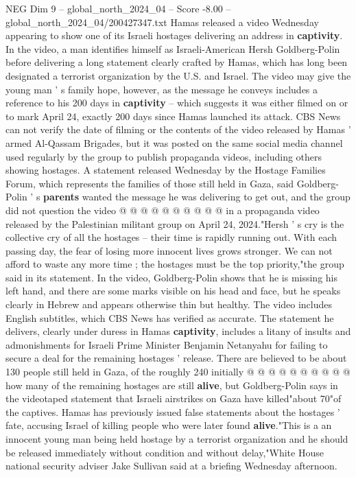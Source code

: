 \begin{textsample}{NEG Dim 9 – global\_north\_2024\_04 – Score -8.00 – global\_north\_2024\_04/200427347.txt}  \label{ex:f9_neg_264}
Hamas released a video Wednesday appearing to show one of its Israeli hostages delivering an address in \textbf{captivity}.
In the video, a man identifies himself as Israeli-American Hersh Goldberg-Polin before delivering a long statement clearly crafted by Hamas, which has long been designated a terrorist organization by the U.S. and Israel.
The video may give the young man ' s family hope, however, as the message he conveys includes a reference to his 200 days in \textbf{captivity} -- which suggests it was either filmed on or to mark April 24, exactly 200 days since Hamas launched its attack.
CBS News can not verify the date of filming or the contents of the video released by Hamas ' armed Al-Qassam Brigades, but it was posted on the same social media channel used regularly by the group to publish propaganda videos, including others showing hostages.
A statement released Wednesday by the Hostage Families Forum, which represents the families of those still held in Gaza, said Goldberg-Polin ' s \textbf{parents} wanted the message he was delivering to get out, and the group did not question the video @ @ @ @ @ @ @ @ @ @ in a propaganda video released by the Palestinian militant group on April 24, 2024."Hersh ' s cry is the collective cry of all the hostages -- their time is rapidly running out.
With each passing day, the fear of losing more innocent lives grows stronger.
We can not afford to waste any more time ; the hostages must be the top priority,"the group said in its statement.
In the video, Goldberg-Polin shows that he is missing his left hand, and there are some marks visible on his head and face, but he speaks clearly in Hebrew and appears otherwise thin but healthy.
The video includes English subtitles, which CBS News has verified as accurate.
The statement he delivers, clearly under duress in Hamas \textbf{captivity}, includes a litany of insults and admonishments for Israeli Prime Minister Benjamin Netanyahu for failing to secure a deal for the remaining hostages ' release.
There are believed to be about 130 people still held in Gaza, of the roughly 240 initially @ @ @ @ @ @ @ @ @ @ how many of the remaining hostages are still \textbf{alive}, but Goldberg-Polin says in the videotaped statement that Israeli airstrikes on Gaza have killed"about 70"of the captives.
Hamas has previously issued false statements about the hostages ' fate, accusing Israel of killing people who were later found \textbf{alive}."This is a an innocent young man being held hostage by a terrorist organization and he should be released immediately without condition and without delay,"White House national security adviser Jake Sullivan said at a briefing Wednesday afternoon.

\end{textsample}
